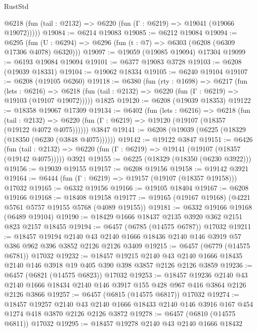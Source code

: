 \begin{lexlean}{RustStd}
\begin{coremodule}
      @6218 (fun (tail : @2132) => @6220 (fun (Γ : @6219) => @19041 (@19066 @19072)))))
@19084 := @6214 @19083
@19085 := @6212 @19084
@19094 := @6295
    (fun (U : @6294) => @6296 (fun (t : @7) => @6303 (@6208 (@6309 @17306 @4078) @6320)))
@19097 := @19059 (@19085 @19094) @17304
@19099 := @6193 @19084 @19094
@19101 := @6377 @19083 @3728
@19103 := @6208 (@19039 @18331)
@19104 := @19062 @18334
@19105 := @6240 @19104
@19107 := @6208 (@19105 @6260)
@19118 := @6380
    (fun (rty : @1698) =>
    @6217
      (fun (lets : @6216) =>
      @6218 (fun (tail : @2132) => @6220 (fun (Γ : @6219) => @19103 (@19107 @19072)))))
    @1825
@19120 := @6208 (@19039 @18353)
@19122 := @18358 @19067 @17309
@19134 := @6402
    (fun (lets : @6216) =>
    @6218
      (fun (tail : @2132) =>
      @6220 (fun (Γ : @6219) => @19120 (@19107 (@18357 (@19122 @4072 @4075))))))
    @3847
@19141 := @6208 (@19039 (@6225 (@18329 (@18350 (@6230 (@3848 @4075))))))
@19142 := @19122 @3847
@19151 := @6426
    (fun (tail : @2132) => @6220 (fun (Γ : @6219) => @19141 (@19107 (@18357 (@19142 @4075)))))
    @3921
@19155 := @6225 (@18329 (@18350 (@6230 @3922)))
@19156 := @19039 @19155
@19157 := @6208 @19156
@19158 := @19142 @3921
@19164 := @6444 (fun (Γ : @6219) => @19157 (@19107 (@18357 @19158))) @17032
@19165 := @6332 @19156
@19166 := @19105 @18404
@19167 := @6208 @19166
@19168 := @18408 @19158
@19177 := @19165 (@19167 @19168) (@4221 @5761 @5757 @19155 @5768 (@4089 @19155))
@19181 := @6332 @19166 @19168 (@6489 @19104)
@19190 := @18429 @1666 @18437 @2135 @3920 @362 @2151 @823 @2157 @18455
@19194 := @6457 (@6785 (@14575 @6787)) @17032
@19211 := @18457
    @19194
    @2140
    @43
    @2140
    @1666
    @18436
    @2140
    @146
    @3919
    @57
    @386
    @962
    @396
    @3852
    @2126
    @2126
    @3409
@19215 := @6457 (@6779 (@14575 @6781)) @17032
@19232 := @18457
    @19215
    @2140
    @43
    @2140
    @1666
    @18435
    @2140
    @146
    @3918
    @19
    @405
    @390
    @398
    @3857
    @2126
    @2126
    @3859
@19236 := @6457 (@6821 (@14575 @6823)) @17032
@19253 := @18457
    @19236
    @2140
    @43
    @2140
    @1666
    @18434
    @2140
    @146
    @3917
    @155
    @428
    @967
    @416
    @3864
    @2126
    @2126
    @3866
@19257 := @6457 (@6815 (@14575 @6817)) @17032
@19274 := @18457
    @19257
    @2140
    @43
    @2140
    @1666
    @18433
    @2140
    @146
    @3916
    @167
    @454
    @1274
    @418
    @3870
    @2126
    @2126
    @3872
@19278 := @6457 (@6810 (@14575 @6811)) @17032
@19295 := @18457
    @19278
    @2140
    @43
    @2140
    @1666
    @18432

\end{coremodule}
\end{lexlean}

